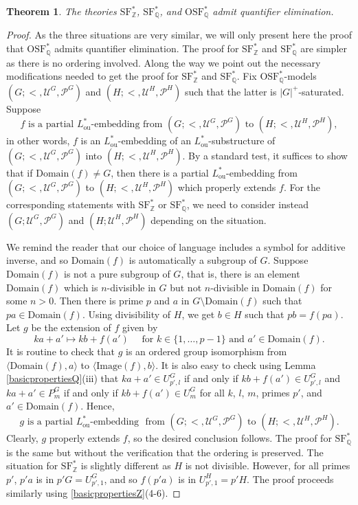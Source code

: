 \documentclass[letterpaper]{amsart}
\newcommand{\qq}{\mathbb{Q}}
\newcommand{\zz}{\mathbb{Z}}
\newcommand{\la}{\langle}
\newcommand{\ra}{\rangle}
\newcommand{\sU}{\mathscr{U}}
\newcommand{\sP}{\mathscr{P}}
\newcommand{\TSFZ}{\mathrm{SF}^*_{\zz}}
\newcommand{\TSFQ}{\mathrm{SF}^*_{\qq}}
\newcommand{\TOSFQ}{\mathrm{OSF}^*_{\qq}}
\newtheorem{thm}{Theorem}[section]
\begin{document}
\begin{thm} \label{QE}
The theories $\TSFZ$, $\TSFQ$, and $\TOSFQ$ admit quantifier elimination.
\end{thm}
\begin{proof}
As the three situations are very similar, we will only present here the proof that $\TOSFQ$ admits quantifier elimination. The proof for  $\TSFZ$ and $\TSFQ$ are simpler as there is no ordering involved. Along the way we point out the necessary modifications needed to get the proof for  $\TSFZ$ and $\TSFQ$. Fix $\TOSFQ$-models  $(G; <, \sU^G, \sP^G)$ and $(H; <, \sU^H, \sP^H)$ such that the latter is $|G|^+$-saturated. Suppose 
$$f \text{ is a partial } L_{\mathrm{ou}}^*\text{-embedding from } (G; <, \sU^G, \sP^G) \text{ to } (H; <, \sU^H , \sP^H ), $$ in other words, $f$ is an $L_{\mathrm{ou}}^*$-embedding of an $L_{\mathrm{ou}}^*$-substructure of $(G; <, \sU^G, \sP^G)$ into $(H; <, \sU^H , \sP^H)$. 
By  a standard test, it suffices to show that  if $\text{Domain}(f) \neq G$, then there is a partial $L_{\mathrm{ou}}^*$-embedding from $(G; <, \sU^G, \sP^G)$  to $(H; <, \sU^H, \sP^H)$ which properly extends $f$. For the corresponding statements with $\TSFZ$ or $\TSFQ$, we need to consider instead $(G; \sU^G, \sP^G)$ and $(H; \sU^H, \sP^H)$  depending on the situation.

We remind the reader that our choice of language includes a symbol for additive inverse, and so $\text{Domain}(f)$ is automatically a subgroup of $G$. Suppose $\text{Domain}(f)$ is not a pure subgroup of $G$, that is, there is an element $\text{Domain}(f)$ which is $n$-divisible in $G$ but not $n$-divisible in $\text{Domain}(f)$ for some $n>0$.   Then there is prime $p$ and $a$ in $G \setminus \text{Domain}(f)$ such that $pa \in \text{Domain}(f) $. Using divisibility of $H$, we get $b \in H$  such that $pb = f(pa)$. Let $g$ be the extension of $f$ given by
$$ ka + a' \mapsto kb + f(a') \quad \text { for }  k\in \{ 1, \ldots, p-1\} \text{ and } a' \in \text{Domain}(f). $$
It is routine to check that $g$ is an ordered group isomorphism from $\la \text{Domain}(f), a\ra$ to $\la \text{Image}(f), b\ra$.  It is also easy to check using Lemma \ref{basicpropertiesQ}(iii) that $ka + a'  \in U^G_{p',l}$ if and only if $kb + f(a') \in U^G_{p',l}$ and $ka + a'  \in P^G_{m}$ if and only if $kb + f(a') \in U^G_{m}$ for all $k$, $l$, $m$, primes $p'$, and $a' \in \text{Domain}(f)$. Hence,
$$g \text{ is a partial } L_{\mathrm{ou}}^*\text{-embedding } \text{ from } (G; <, \sU^G, \sP^G) \text{ to } (H; <, \sU^H , \sP^H ). $$
Clearly, $g$ properly extends $f$, so the desired conclusion follows. The proof for $\TSFQ$ is the same but without the verification that the ordering is preserved. The situation for $\TSFZ$ is slightly different as $H$ is not divisible. However, for all primes $p'$, $p'a$ is in  $p'G = U^G_{p', 1}$, and so $f(p'a)$ is in $ U^H_{p', 1} = p'H$. The proof proceeds similarly using \ref{basicpropertiesZ}(4-6).


\end{proof}
\end{document}
